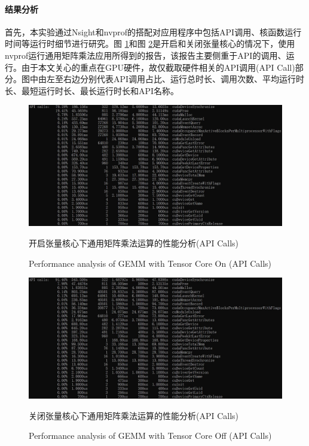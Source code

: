 \paragraph{结果分析}
\par 首先，本实验通过Nsight和nvprof的搭配对应用程序中包括API调用、核函数运行时间等运行时细节进行研究。图 \ref{Fig.GEMMPROFTF}和图 \ref{Fig.GEMMPROFNOTF}是开启和关闭张量核心的情况下，使用nvprof运行通用矩阵乘法应用所得到的报告，该报告主要侧重于API的调用、运行。由于本文关心的重点在GPU硬件，故仅截取硬件相关的API调用(API Call)部分。图中由左至右边分别代表API调用占比、运行总时长、调用次数、平均运行时长、最短运行时长、最长运行时长和API名称。
\begin{figure}
	\centering
	\includegraphics[width=15cm]{figures/GEMM-TF.jpg}
	\renewcommand{\thefigure}{\arabic{section}-\arabic{figure} }
	\renewcommand{\figurename}{图}
	\caption{开启张量核心下通用矩阵乘法运算的性能分析(API Calls)}
	\addtocounter{figure}{-1}
	\renewcommand{\thefigure}{\arabic{section}-\arabic{figure} }
	\renewcommand{\figurename}{Figure}
	\caption{Performance analysis of GEMM with Tensor Core On (API Calls)}
	\label{Fig.GEMMPROFTF}
\end{figure}
\begin{figure}
	\centering
	\includegraphics[width=15cm]{figures/GEMM-NOTF.jpg}
	\renewcommand{\thefigure}{\arabic{section}-\arabic{figure} }
	\renewcommand{\figurename}{图}
	\caption{关闭张量核心下通用矩阵乘法运算的性能分析(API Calls)}
	\addtocounter{figure}{-1}
	\renewcommand{\thefigure}{\arabic{section}-\arabic{figure} }
	\renewcommand{\figurename}{Figure}
	\caption{Performance analysis of GEMM with Tensor Core Off (API Calls)}
	\label{Fig.GEMMPROFNOTF}
\end{figure}
